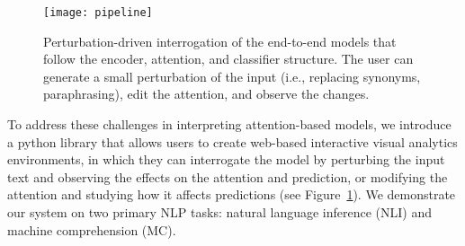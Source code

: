 \begin{figure}[htbp]
\centering
\vspace{-2mm}
 \texttt{[image: pipeline]}
 \vspace{-3mm}
 \caption{
 Perturbation-driven interrogation of the end-to-end models that follow the encoder, attention, and classifier structure. The user can generate a small perturbation of the input (i.e., replacing synonyms, paraphrasing), edit the attention, and observe the changes.
 }
 \vspace{-3mm}
\label{fig:modelPipeline}
\end{figure}


To address these challenges in interpreting attention-based models, 
we introduce a python library that allows users to create web-based interactive visual analytics environments,
in which they can interrogate the model by perturbing the input text and observing the effects on the attention and prediction, or modifying the attention and studying how it affects predictions (see Figure~\ref{fig:modelPipeline}).
%
We demonstrate our system on two primary NLP tasks: natural language
inference (NLI) and machine comprehension (MC). 




